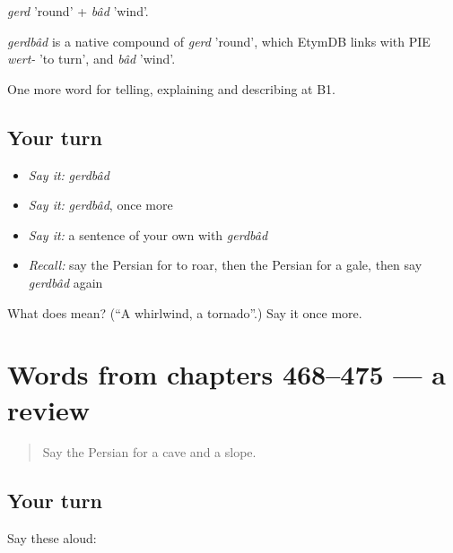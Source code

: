 \emph{gerd} 'round' + \emph{bâd} 'wind'.

\begin{cousinweb}
\emph{gerdbâd} is a native compound of \emph{gerd} 'round', which EtymDB links with PIE \emph{wert-} 'to turn', and \emph{bâd} 'wind'.
\end{cousinweb}

\begin{grammarlens}[title={What you've built}]
One more word for telling, explaining and describing at B1.
\end{grammarlens}

\subsection*{Your turn}
\begin{itemize}
\raggedright
  \item \emph{Say it:} \emph{gerdbâd}
  \item \emph{Say it:} \emph{gerdbâd}, once more
  \item \emph{Say it:} a sentence of your own with \emph{gerdbâd}
  \item \emph{Recall:} say the Persian for to roar, then the Persian for a gale, then say \emph{gerdbâd} again
\end{itemize}

\begin{tcolorbox}[breakable,colback=teal!4,colframe=teal!35!black,title={Before you move on}]
What does  mean? (\textquotedblleft{}A whirlwind, a tornado\textquotedblright{}.) Say it once more.
\end{tcolorbox}
\section[(dialogue)]{Words from chapters 468–475 — a review}

\label{lesson:FA-R475-review-468-475}



\begin{quote}
Say the Persian for a cave and a slope.
\end{quote}

\subsection*{Your turn}
Say these aloud:


